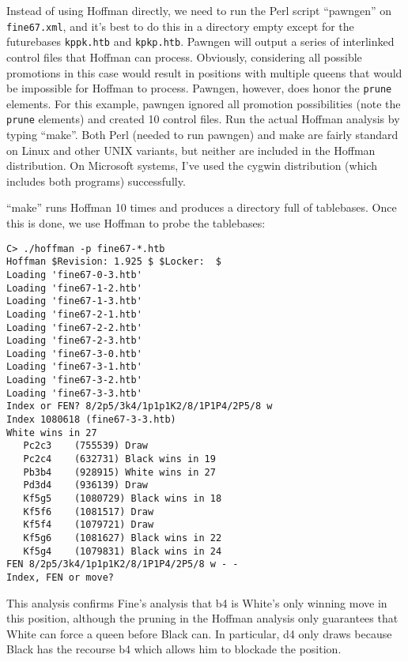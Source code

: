 \documentclass[11pt]{article}
\begin{document}
Instead of using Hoffman directly, we need to run the Perl script ``pawngen'' on
{\tt fine67.xml}, and it's best to do this in a directory empty except
for the futurebases {\tt kppk.htb} and {\tt kpkp.htb}.  Pawngen will
output a series of interlinked control files that Hoffman can process.
Obviously, considering all possible promotions in this case would
result in positions with multiple queens that would be impossible for
Hoffman to process.  Pawngen, however, does honor the {\tt prune}
elements.  For this example, pawngen ignored all promotion
possibilities (note the {\tt prune} elements) and created 10 control
files.  Run the actual Hoffman analysis by typing ``make''.
Both Perl (needed to run pawngen) and make are fairly standard on
Linux and other UNIX variants, but neither are included in the Hoffman
distribution.  On Microsoft systems, I've used the cygwin distribution
(which includes both programs) successfully.

``make'' runs Hoffman 10 times and produces a directory full of
tablebases.  Once this is done, we use Hoffman to probe the tablebases:

\begin{verbatim}
C> ./hoffman -p fine67-*.htb
Hoffman $Revision: 1.925 $ $Locker:  $
Loading 'fine67-0-3.htb'
Loading 'fine67-1-2.htb'
Loading 'fine67-1-3.htb'
Loading 'fine67-2-1.htb'
Loading 'fine67-2-2.htb'
Loading 'fine67-2-3.htb'
Loading 'fine67-3-0.htb'
Loading 'fine67-3-1.htb'
Loading 'fine67-3-2.htb'
Loading 'fine67-3-3.htb'
Index or FEN? 8/2p5/3k4/1p1p1K2/8/1P1P4/2P5/8 w
Index 1080618 (fine67-3-3.htb)
White wins in 27
   Pc2c3    (755539) Draw
   Pc2c4    (632731) Black wins in 19
   Pb3b4    (928915) White wins in 27
   Pd3d4    (936139) Draw
   Kf5g5    (1080729) Black wins in 18
   Kf5f6    (1081517) Draw
   Kf5f4    (1079721) Draw
   Kf5g6    (1081627) Black wins in 22
   Kf5g4    (1079831) Black wins in 24
FEN 8/2p5/3k4/1p1p1K2/8/1P1P4/2P5/8 w - -
Index, FEN or move? 
\end{verbatim}

This analysis confirms Fine's analysis that b4 is White's only winning
move in this position, although the pruning in the Hoffman analysis
only guarantees that White can force a queen before Black can.  In
particular, d4 only draws because Black has the recourse b4 which
allows him to blockade the position.
\end{document}
